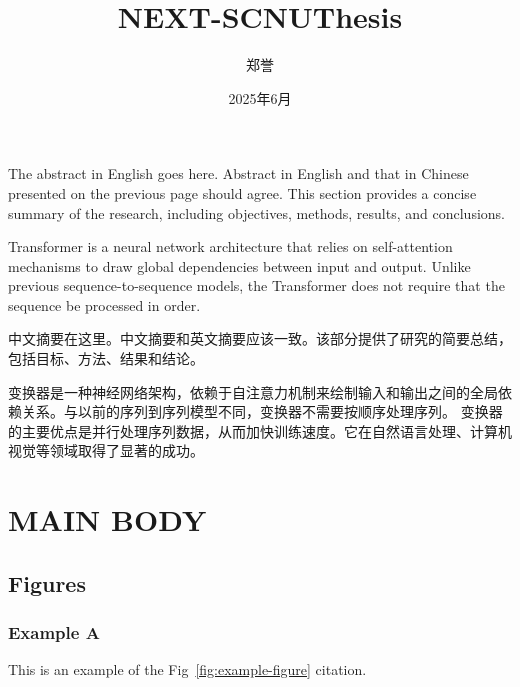 \documentclass{NEXT-SCNUThesis}
\title{NEXT-SCNUThesis}
\author{郑誉}
\institute{xxx}
\date{2025年6月}
\begin{document}
    \maketitle

    \begin{abstracten}
        The abstract in English goes here. Abstract in English and that in
        Chinese presented on the previous page should agree. This section provides
        a concise summary of the research, including objectives, methods,
        results, and conclusions.

        Transformer is a neural network architecture that relies on self-attention
        mechanisms to draw global dependencies between input and output. Unlike
        previous sequence-to-sequence models, the Transformer does not require that
        the sequence be processed in order.
    \end{abstracten}

    \begin{abstractzh}
        中文摘要在这里。中文摘要和英文摘要应该一致。该部分提供了研究的简要总结，包括目标、方法、结果和结论。

        变换器是一种神经网络架构，依赖于自注意力机制来绘制输入和输出之间的全局依赖关系。与以前的序列到序列模型不同，变换器不需要按顺序处理序列。
        变换器的主要优点是并行处理序列数据，从而加快训练速度。它在自然语言处理、计算机视觉等领域取得了显著的成功。
    \end{abstractzh}

    \toc

    \chapter{MAIN BODY}

    \section{Figures}
    \subsection{Example A}
    This is an example of the Fig~\ref{fig:example-figure} citation.
\end{document}
